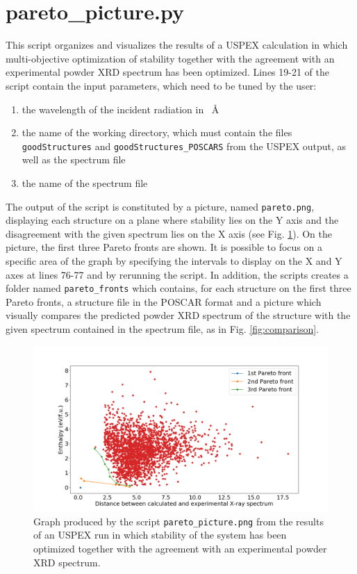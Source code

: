 \documentclass{article}
\begin{document}
\section{pareto\_picture.py}
This script organizes and visualizes the results of a USPEX calculation in which multi-objective optimization of stability together with the agreement with an experimental powder XRD spectrum has been optimized. Lines 19-21 of the script contain the input parameters, which need to be tuned by the user:
\begin{enumerate}
	\item  the wavelength of the incident radiation in \SI{}{\angstrom}
	\item the name of the working directory, which must contain the files \texttt{goodStr\-uctures} and \texttt{goodStructures\_POSCARS} from the USPEX output, as well as the spectrum file
	\item the name of the spectrum file
\end{enumerate}
The output of the script is constituted by a picture, named \texttt{pareto.png}, displaying each structure on a plane where stability lies on the Y axis and the disagreement with the given spectrum lies on the X axis (see Fig. \ref{fig:pfronts}). On the picture, the first three Pareto fronts are shown. It is possible to focus on a specific area of the graph by specifying the intervals to display on the X and Y axes at lines 76-77 and by rerunning the script. In addition, the scripts creates a folder named \texttt{pareto\_fronts} which contains, for each structure on the first three Pareto fronts, a structure file in the POSCAR format and a picture which visually compares the predicted powder XRD spectrum of the structure with the given spectrum contained in the spectrum file, as in Fig. \ref{fig:comparison}.
\begin{figure}
	\centering
	\includegraphics[width=\textwidth]{pareto.png}
	\caption{Graph produced by the script \texttt{pareto\_picture.png} from the results of an USPEX run in which stability of the system  has been optimized together with the agreement with an experimental powder XRD spectrum.}
	\label{fig:pfronts}
\end{figure}
\end{document}
